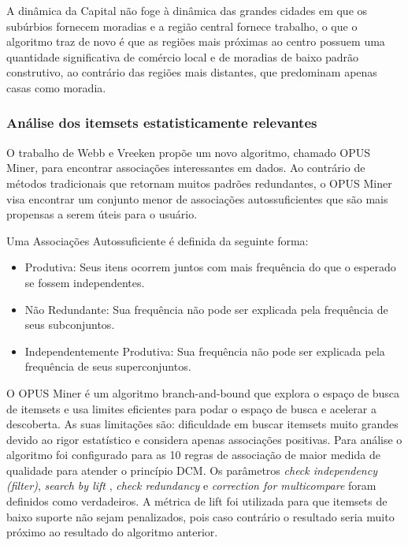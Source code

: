 \documentclass[12pt]{article}
\begin{document}
A dinâmica da Capital não foge à dinâmica das grandes cidades em que os subúrbios fornecem moradias e a região central fornece trabalho, o que o algoritmo traz de novo é que as regiões mais próximas ao centro possuem uma quantidade significativa de comércio local e de moradias de baixo padrão construtivo, ao contrário das regiões mais distantes, que predominam apenas casas como moradia. 

\subsubsection{Análise dos itemsets estatisticamente relevantes}
O trabalho de Webb e Vreeken \cite{webb2013efficient} propõe um novo algoritmo, chamado OPUS Miner, para encontrar associações interessantes em dados. Ao contrário de métodos tradicionais que retornam muitos padrões redundantes, o OPUS Miner visa encontrar um conjunto menor de associações autossuficientes que são mais propensas a serem úteis para o usuário. 

Uma Associações Autossuficiente é definida da seguinte forma: 
\begin{itemize}
    \item Produtiva: Seus itens ocorrem juntos com mais frequência do que o esperado se fossem independentes.
    \item Não Redundante: Sua frequência não pode ser explicada pela frequência de seus subconjuntos. 
    \item Independentemente Produtiva: Sua frequência não pode ser explicada pela frequência de seus superconjuntos. 
\end{itemize}

O OPUS Miner é um algoritmo branch-and-bound que explora o espaço de busca de itemsets e usa limites eficientes para podar o espaço de busca e acelerar a descoberta. As suas limitações são: dificuldade em buscar itemsets muito grandes devido ao rigor estatístico e considera apenas associações positivas. Para análise o algoritmo foi configurado para as 10 regras de associação de maior medida de qualidade para atender o princípio DCM. Os parâmetros \textit{check independency (filter)}, \textit{search by lift} \cite{wiki:lift}, \textit{check redundancy} e \textit{correction for multicompare} foram definidos como verdadeiros. A métrica de lift foi utilizada para que itemsets de baixo suporte não sejam penalizados, pois caso contrário o resultado seria muito próximo ao resultado do algoritmo anterior.
\end{document}
